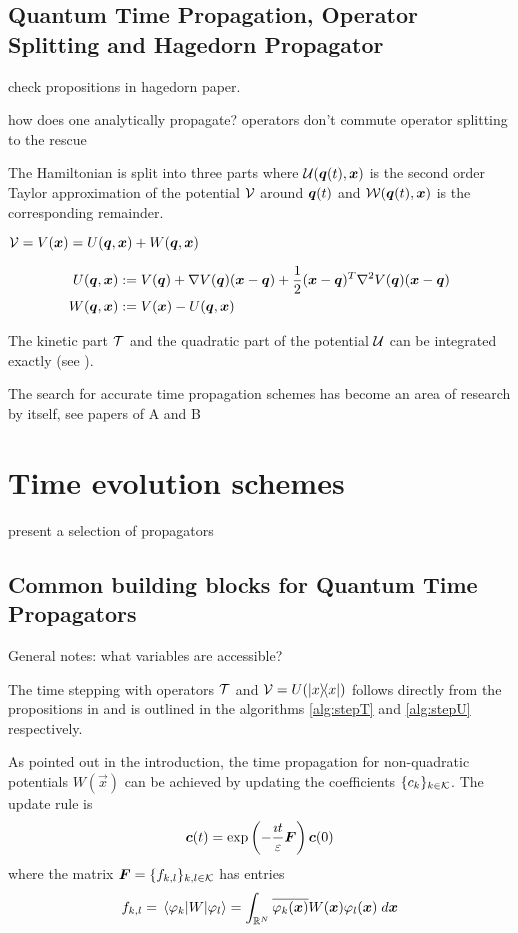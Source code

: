 \subsection{Quantum Time Propagation, Operator Splitting and Hagedorn Propagator}

check propositions in hagedorn paper.

how does one analytically propagate?
operators don't commute
operator splitting to the rescue


The Hamiltonian is split into three parts
where $\mathcal{U}(\bm{q}(t),\bm{x})$ is the second order Taylor approximation of the potential $\mathcal{V}$ around $\bm{q}(t)$ and $\mathcal{W}(\bm{q}(t),\bm{x})$ is the corresponding remainder.

$\mathcal{V} = V(\bm{x}) = U(\bm{q},\bm{x}) + W(\bm{q},\bm{x})$

\begin{align}
	U(\bm{q},\bm{x}) &:= V(\bm{q}) + \nabla V(\bm{q}) (\bm{x}-\bm{q})
	+ \frac{1}{2} (\bm{x}-\bm{q})^T \nabla^2 V(\bm{q}) (\bm{x}-\bm{q}) \\
	W(\bm{q},\bm{x}) &:= V(\bm{x}) - U(\bm{q},\bm{x})
\end{align}

The kinetic part $\mathcal{T}$ and the quadratic part of the potential $\mathcal{U}$ can be integrated exactly (see \cite{FGL_semiclassical_dynamics}).


The search for accurate time propagation schemes has become an area of research by itself, see papers of A and B


\clearpage
\section{Time evolution schemes}

present a selection of propagators

\subsection{Common building blocks for Quantum Time Propagators}
%

General notes: what variables are accessible?


The time stepping with operators $\mathcal{T}$ and $\mathcal{V} = U(\op{x})$ follows directly from the propositions in \cite{FGL_semiclassical_dynamics} and is outlined in the algorithms \ref{alg:stepT} and \ref{alg:stepU} respectively.

As pointed out in the introduction, the time propagation for non-quadratic potentials $W(\vec{x})$ can be achieved by updating the coefficients $\{ c_k \}_{k \in \mathcal{K}}$.
The update rule is
%
\begin{align}
	\bm{c}(t) = \exp \left( - \frac{\imath t}{\varepsilon} \bm{F} \right) \bm{c}(0)
\end{align}
%
where the matrix $\bm{F} = \{ f_{k,l} \}_{k,l \in \mathcal{K}}$ has entries
%
\begin{align}
	f_{k,l} = \matrixel{\varphi_k}{W}{\varphi_l}
	= \int_{\R^N} \conj{\varphi_k(\bvec{x})} W(\bvec{x}) \varphi_l(\bvec{x}) \; \dif \bvec{x}
\end{align}


